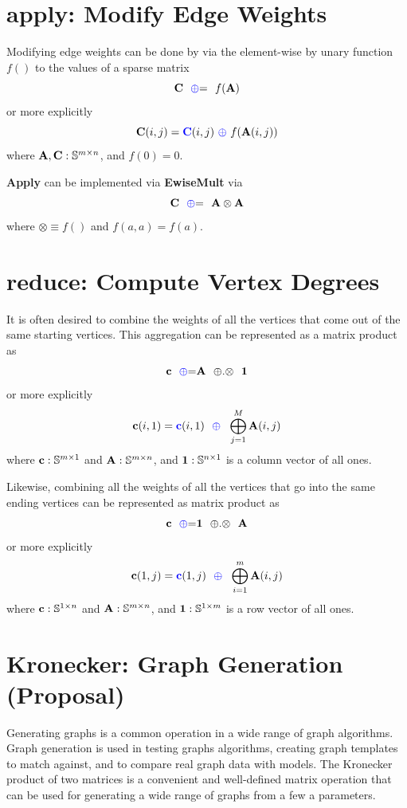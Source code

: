 \section{apply: Modify Edge Weights}
  Modifying edge weights can be done by via the element-wise by unary function $f()$ to the values of a sparse matrix
$$
   {\bf C} ~~ {\textcolor{blue}{\oplus}}{=} ~~ f({\bf A})
$$
or more explicitly
$$
   {\bf C}(i,j) = {\textcolor{blue}{\bf C}}(i,j) ~ {\textcolor{blue}{\oplus}} ~f({\bf A}(i,j))
$$
where ${\bf A},{\bf C}: \mathbb{S}^{m \times n}$, and $f(0) = 0$.

  {\bf Apply} can be implemented via {\bf EwiseMult} via
$$
   {\bf C} ~~ {\textcolor{blue}{\oplus}}{=} ~~ {\bf A} \otimes {\bf A}
$$
where $\otimes \equiv f()$ and $f(a,a) = f(a)$.

\section{reduce: Compute Vertex Degrees}
  It is often desired to combine the weights of all the vertices that come out of the same starting vertices.  This aggregation can be represented as a matrix product as
$$
   {\bf c} ~~ {\textcolor{blue}{\oplus}}{=} {\bf A} ~~ {\oplus}.{\otimes} ~~{\bf 1}
$$
or more explicitly
$$
   {\bf c}(i,1) = {\textcolor{blue}{\bf c}}(i,1) ~~ {\textcolor{blue}{\oplus}} ~~ \bigoplus_{j=1}^M {\bf A}(i,j)
$$
where ${\bf c}: \mathbb{S}^{m \times 1}$ and ${\bf A}: \mathbb{S}^{m \times n}$, and ${\bf 1}: \mathbb{S}^{n \times 1}$ is a column vector of all ones.

Likewise, combining all the weights of all the vertices that go into the same ending vertices can be represented as matrix product as
$$
   {\bf c} ~~ {\textcolor{blue}{\oplus}}{=}  {\bf 1} ~~ {\oplus}.{\otimes} ~~{\bf A} 
$$
or more explicitly
$$
   {\bf c}(1,j) = {\textcolor{blue}{\bf c}}(1,j) ~~ {\textcolor{blue}{\oplus}} ~~ \bigoplus_{i=1}^m {\bf A}(i,j)
$$
where ${\bf c}: \mathbb{S}^{1 \times n}$ and ${\bf A}: \mathbb{S}^{m \times n}$, and ${\bf 1}: \mathbb{S}^{1 \times m}$ is a row vector of all ones.


\section{Kronecker: Graph Generation (Proposal)}

  Generating graphs is a common operation in a wide range of graph algorithms.  Graph generation is used in testing graphs algorithms, creating graph templates to match against, and to compare real graph data with models.  The Kronecker product of two matrices is a convenient and well-defined matrix operation that can be used for generating a wide range of graphs from a few a parameters.

